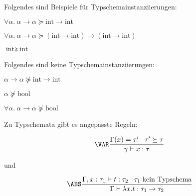 \begin{beispiel}[Typschemainstanziierung]
    Folgendes sind Beispiele für Typschemainstanziierungen:
    \begin{bspenum}
        \item $\forall \alpha.\ \alpha \rightarrow \alpha \succeq \text{int} \rightarrow \text{int}$
        \item $\forall \alpha.\ \alpha \rightarrow \alpha \succeq (\text{int} \rightarrow \text{int}) \rightarrow (\text{int} \rightarrow \text{int})$
        \item $\text{int} \succeq \text{int}$
    \end{bspenum}

    Folgendes sind keine Typschemainstanziierungen:
    \begin{bspenum}
        \item $\alpha \rightarrow \alpha \nsucceq \text{int} \rightarrow \text{int}$
        \item $\alpha \nsucceq \text{bool}$
        \item $\forall \alpha.\ \alpha \rightarrow \alpha \nsucceq \text{bool}$
    \end{bspenum}
\end{beispiel}

Zu Typschemata gibt es angepasste Regeln:

\[\VAR \frac{\Gamma(x)= \tau' \;\;\; \tau' \succeq \tau}{\gamma \vdash x: \tau}\]

und

\[\ABS \frac{\Gamma, x: \tau_1 \vdash t: \tau_2 \;\;\; \tau_1 \text{ kein Typschema}}{\Gamma \vdash  \lambda x. t: \tau_1 \rightarrow \tau_2}\]

